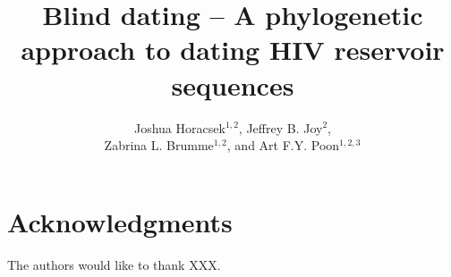 \documentclass[10pt,a4paper,twocolumn]{article}
\begin{document}
\title{Blind dating -- A phylogenetic approach to dating HIV reservoir sequences}

\author{Joshua Horacsek$^{1,2}$, Jeffrey B. Joy$^2$, \\ Zabrina L. Brumme$^{1,2}$, and Art F.Y. Poon$^{1,2,3}$}
\twocolumn[
  \begin{@twocolumnfalse}
    \maketitle
    \begin{abstract}

    \end{abstract}
  \end{@twocolumnfalse}
]







\section{Acknowledgments} \label{sec:ackn}
The authors would like to thank XXX.


%
%
%
%
%


\end{document}
